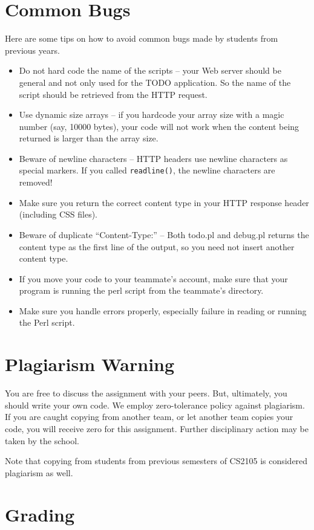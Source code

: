 \documentclass[a4paper,11pt]{exam}
\begin{document}
\section*{Common Bugs}

Here are some tips on how to avoid common bugs made by students from previous years.
\begin{itemize}
		\item Do not hard code the name of the scripts -- your Web server should be general and not only used for the TODO application.  So the name of the script should be retrieved from the HTTP request.
		\item Use dynamic size arrays -- if you hardcode your array size with a magic number (say, 10000 bytes), your code will not work when the content being returned is larger than the array size.
		\item Beware of newline characters -- HTTP headers use newline characters as special markers.  If you called \texttt{readline()}, the newline characters are removed!
		\item Make sure you return the correct content type in your HTTP response header (including CSS files).
		\item Beware of duplicate ``Content-Type:'' -- Both todo.pl and debug.pl returns the content type as the first line of the output, so you need not insert another content type.
		\item If you move your code to your teammate's account, make sure that your program is running the perl script from the teammate's directory.
		\item Make sure you handle errors properly, especially failure in reading or running the Perl script.
\end{itemize}

\section*{Plagiarism Warning}

You are free to discuss the assignment with your peers. But, ultimately, you should write your own code. We employ zero-tolerance policy against plagiarism. If you are caught copying from another team, or let another team copies your code, you will receive zero for this assignment. Further disciplinary action may be taken by the school.

Note that copying from students from previous semesters of CS2105 is considered plagiarism as well.

\section*{Grading}
\end{document}
